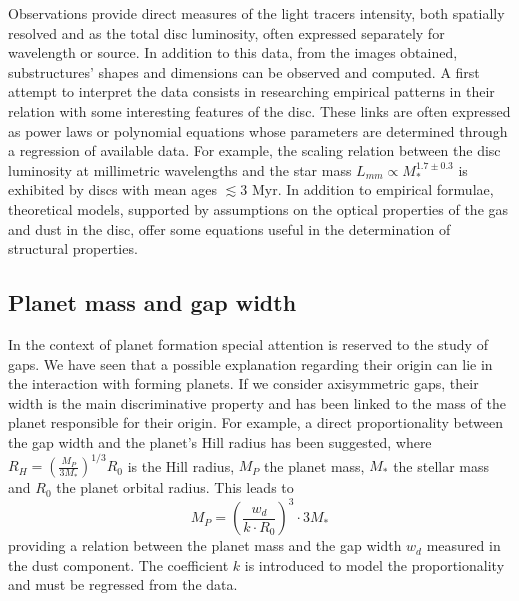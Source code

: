 \documentclass[a4paper,10pt]{report}
\begin{document}

Observations provide direct measures of the light tracers intensity, both spatially resolved and as
the total disc luminosity, often expressed separately for wavelength or source.
In addition to this data, from the images obtained, substructures' shapes and
dimensions can be observed and computed.
A first attempt to interpret the data consists in researching empirical patterns in their relation with some
interesting features of the disc. These links are often expressed as power laws or polynomial equations whose parameters are
determined through a regression of available data.
For example, the scaling relation between the disc luminosity at millimetric wavelengths and the star mass $L_{mm} \propto M_*^{1.7\pm0.3}$
is exhibited by discs with mean ages $\lesssim 3$ Myr.
In addition to empirical formulae, theoretical models, supported by assumptions on
the optical properties of the gas and dust in the disc, offer some equations useful
in the determination of structural properties.

\subsection{Planet mass and gap width}

In the context of planet formation special attention is reserved to the study of gaps. 
We have seen that a possible explanation regarding their origin can lie in the interaction with
forming planets. If we consider axisymmetric gaps, their width is the main discriminative property and
has been linked to the mass of the planet responsible for their origin.
For example, a direct proportionality between the gap width and the planet's Hill radius has been suggested, where
$
    R_H = (\frac{M_P}{3M_*})^{1/3}R_0
$
is the Hill radius, $M_P$ the planet mass, $M_*$ the stellar mass and $R_0$ the planet orbital radius.
This leads to 
\begin{equation}
    M_P = (\frac{w_d}{k\cdot R_0})^3\cdot 3M_*
\end{equation}
providing a relation between the planet mass and the gap width $w_d$ measured in the dust component.
The coefficient $k$ is introduced to model the proportionality and must be regressed from the data.
\end{document}
